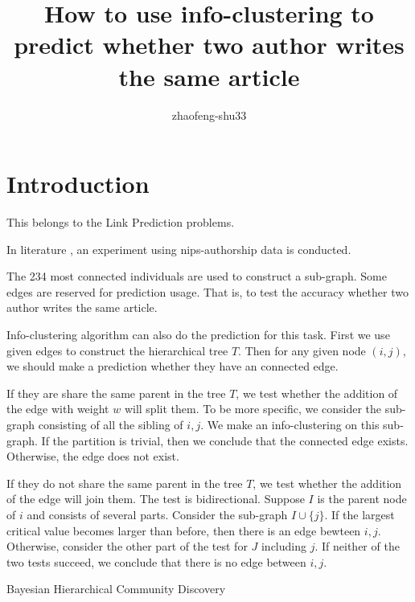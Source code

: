 \documentclass{article}
\title{How to use info-clustering to predict whether two author writes the same article}
\author{zhaofeng-shu33 }
\begin{document}
\maketitle

\section{Introduction}
This belongs to the Link Prediction problems.

In literature \cite{bhcd}, an experiment using nips-authorship data is conducted.

The 234 most connected individuals are used to construct a sub-graph. Some edges are reserved for prediction usage. That is, to test the accuracy whether two author writes the same article.

Info-clustering algorithm can also do the prediction for this task. First we use given edges to construct the hierarchical tree $T$. Then for any given node $(i,j)$, we should make a prediction whether they have an connected edge.

If they are share the same parent in the tree $T$, we test whether the addition of the edge with weight $w$ will split them. To be more specific, we consider the sub-graph consisting of all the sibling of $i,j$. We make an info-clustering on this sub-graph. If the partition is trivial, then we conclude that the connected edge exists. Otherwise, the edge does not exist.

If they do not share the same parent in the tree $T$, we test whether the addition of the edge will join them. The test is bidirectional. Suppose $I$ is the parent node of $i$ and consists of several parts. Consider the sub-graph $I \cup \{j\}$. If the largest critical value becomes larger than before, then there is an edge bewteen $i,j$. Otherwise, consider the other part of the test for $J$ including $j$. If neither of the two tests succeed, we conclude that there is no edge between $i,j$.

\begin{thebibliography}{9}
 Bayesian Hierarchical Community Discovery

\end{thebibliography}
\end{document}
